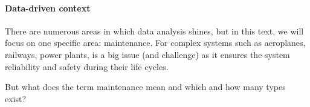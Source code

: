 \paragraph{Data-driven context}
There are numerous areas in which data analysis shines, but in this text, we will focus on one specific area: maintenance.
For complex systems such as aeroplanes, railways, power plants, is a big issue (and challenge) as it ensures the system reliability and safety during their life cycles.

But what does the term maintenance mean and which and how many types exist?